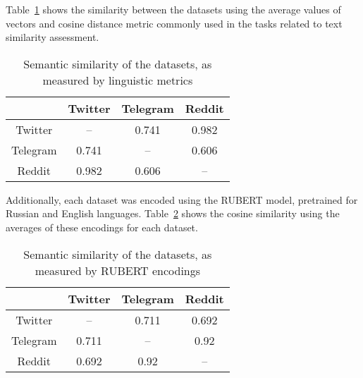 Table~\cref{tab:semanticSimilarityMetrics} shows the similarity between the datasets using the average values of vectors and cosine distance metric commonly used in the tasks related to text similarity assessment.

\begin{table}[ht]%
	\centering
	\caption{Semantic similarity of the datasets, as measured by linguistic metrics}%
	\label{tab:semanticSimilarityMetrics}%
		\begin{tabular}{ c  c  c  c  }%
			\toprule
			& Twitter & Telegram & Reddit\\
			\hline
			Twitter & -- & 0.741 & 0.982\\
			Telegram & 0.741 & -- & 0.606\\
			Reddit & 0.982 & 0.606 & --\\
			\bottomrule
		\end{tabular}%
\end{table}

Additionally, each dataset was encoded using the RUBERT model, pretrained for Russian and English languages. Table~\cref{tab:semanticSimilarityRUBERT} shows the cosine similarity using the averages of these encodings for each dataset.

\begin{table}[ht]%
	\centering
	\caption{Semantic similarity of the datasets, as measured by RUBERT encodings}%
	\label{tab:semanticSimilarityRUBERT}%
		\begin{tabular}{ c  c  c  c  }%
			\toprule
			& Twitter & Telegram & Reddit\\
			\hline
			Twitter & -- & 0.711 & 0.692\\
			Telegram & 0.711 & -- & 0.92\\
			Reddit & 0.692 & 0.92 & -- \\
			\bottomrule
		\end{tabular}%
\end{table}

